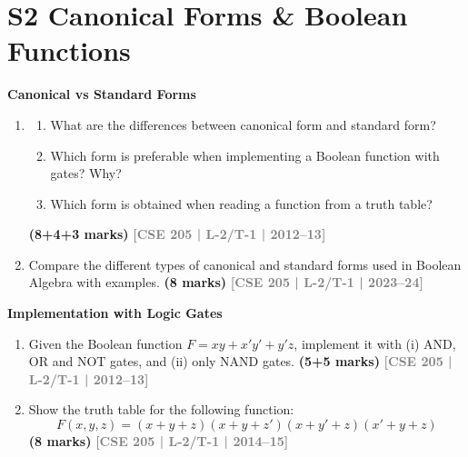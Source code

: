 \documentclass[12pt,a4paper]{article}
\newcommand{\yr}[1]{\hfill\textcolor{gray}{\small\textbf{[#1]}}}
\newcommand{\mk}[1]{\textcolor{orange!70!black}{\small\textbf{(#1 marks)}}}
\newcommand{\subtopic}[2]{%
  \vspace{10pt}
  \noindent\begin{tcolorbox}[colback=#1!8,colframe=#1,boxrule=0.6pt,arc=4pt,
    left=6pt,right=6pt,top=4pt,bottom=4pt]
    \small\bfseries\textcolor{#1}{#2}
  \end{tcolorbox}
  \vspace{2pt}
}
\begin{document}
\section*{S2 \quad Canonical Forms \& Boolean Functions}

\subtopic{cB}{Canonical vs Standard Forms}
\label{sub:s2-canonical}

\begin{enumerate}

\item
\begin{enumerate}
  \item What are the differences between canonical form and standard form?
  \item Which form is preferable when implementing a Boolean function with gates? Why?
  \item Which form is obtained when reading a function from a truth table?
\end{enumerate}
\mk{8+4+3} \yr{CSE 205 | L-2/T-1 | 2012--13}

\item Compare the different types of canonical and standard forms used in Boolean Algebra with examples.
\mk{8} \yr{CSE 205 | L-2/T-1 | 2023--24}

\end{enumerate}

\subtopic{cB}{Implementation with Logic Gates}
\label{sub:s2-implementation}

\begin{enumerate}

\item Given the Boolean function $F = xy + x'y' + y'z$, implement it with (i) AND, OR and NOT gates, and (ii) only NAND gates.
\mk{5+5} \yr{CSE 205 | L-2/T-1 | 2012--13}


\item Show the truth table for the following function:
\[ F(x, y, z) = (x+y+z)(x+y+z')(x+y'+z)(x'+y+z) \]
\mk{8} \yr{CSE 205 | L-2/T-1 | 2014--15}

\end{enumerate}
\end{document}
